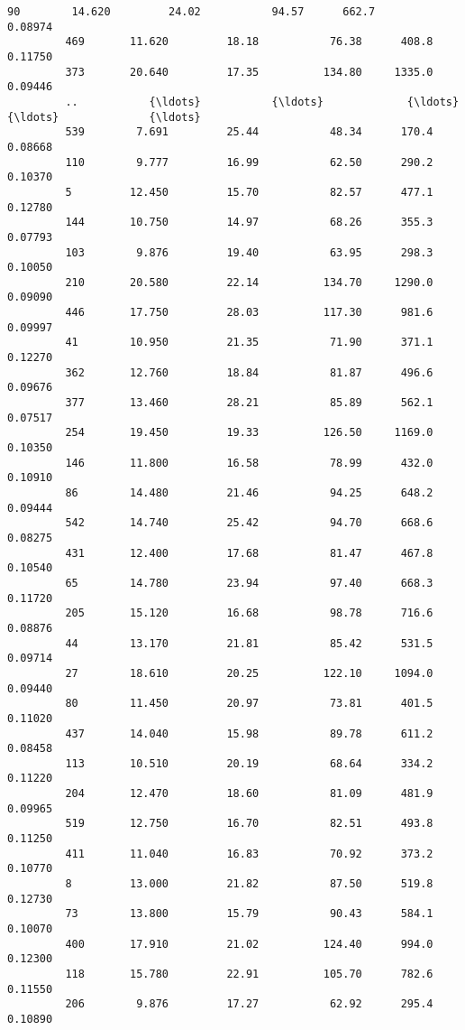 \documentclass[11pt]{article}
\begin{document}
\begin{Verbatim}[commandchars=\\\{\}]
         90        14.620         24.02           94.57      662.7          0.08974   
         469       11.620         18.18           76.38      408.8          0.11750   
         373       20.640         17.35          134.80     1335.0          0.09446   
         ..           {\ldots}           {\ldots}             {\ldots}        {\ldots}              {\ldots}   
         539        7.691         25.44           48.34      170.4          0.08668   
         110        9.777         16.99           62.50      290.2          0.10370   
         5         12.450         15.70           82.57      477.1          0.12780   
         144       10.750         14.97           68.26      355.3          0.07793   
         103        9.876         19.40           63.95      298.3          0.10050   
         210       20.580         22.14          134.70     1290.0          0.09090   
         446       17.750         28.03          117.30      981.6          0.09997   
         41        10.950         21.35           71.90      371.1          0.12270   
         362       12.760         18.84           81.87      496.6          0.09676   
         377       13.460         28.21           85.89      562.1          0.07517   
         254       19.450         19.33          126.50     1169.0          0.10350   
         146       11.800         16.58           78.99      432.0          0.10910   
         86        14.480         21.46           94.25      648.2          0.09444   
         542       14.740         25.42           94.70      668.6          0.08275   
         431       12.400         17.68           81.47      467.8          0.10540   
         65        14.780         23.94           97.40      668.3          0.11720   
         205       15.120         16.68           98.78      716.6          0.08876   
         44        13.170         21.81           85.42      531.5          0.09714   
         27        18.610         20.25          122.10     1094.0          0.09440   
         80        11.450         20.97           73.81      401.5          0.11020   
         437       14.040         15.98           89.78      611.2          0.08458   
         113       10.510         20.19           68.64      334.2          0.11220   
         204       12.470         18.60           81.09      481.9          0.09965   
         519       12.750         16.70           82.51      493.8          0.11250   
         411       11.040         16.83           70.92      373.2          0.10770   
         8         13.000         21.82           87.50      519.8          0.12730   
         73        13.800         15.79           90.43      584.1          0.10070   
         400       17.910         21.02          124.40      994.0          0.12300   
         118       15.780         22.91          105.70      782.6          0.11550   
         206        9.876         17.27           62.92      295.4          0.10890   
         

\end{Verbatim}
\end{document}
